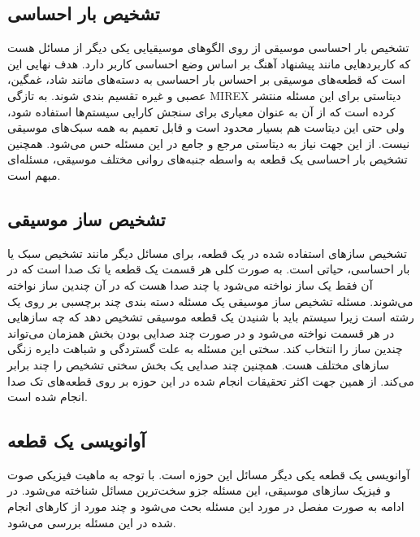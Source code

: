 \subsection{تشخیص بار احساسی}
تشخیص بار احساسی موسیقی از روی الگوهای موسیقیایی یکی دیگر از مسائل هست که
کاربردهایی مانند پیشنهاد آهنگ بر اساس وضع احساسی کاربر دارد. هدف نهایی این است
که قطعه‌های موسیقی بر احساس بار احساسی به دسته‌های مانند شاد، غمگین، عصبی و
غیره تقسیم بندی شوند. به تازگی
MIREX
دیتاستی برای این مسئله منتشر کرده است که از آن به عنوان معیاری برای سنجش کارایی
سیستم‌ها استفاده شود، ولی حتی این دیتاست هم بسیار محدود است و قابل تعمیم به همه
سبک‌های موسیقی نیست. از این جهت نیاز به دیتاستی مرجع و جامع در این مسئله حس
می‌شود. همچنین تشخیص بار احساسی یک قطعه به واسطه جنبه‌های روانی مختلف موسیقی،
مسئله‌ای مبهم است.

\subsection{تشخیص ساز موسیقی}
تشخیص سازهای استفاده شده در یک قطعه، برای مسائل دیگر مانند تشخیص سبک یا بار
احساسی، حیاتی است. به صورت کلی هر قسمت یک قطعه یا تک صدا است که در آن فقط یک
ساز نواخته می‌شود یا چند صدا هست که در آن چندین ساز نواخته می‌شوند. مسئله
تشخیص ساز موسیقی یک مسئله دسته بندی چند برچسبی بر روی یک رشته است زیرا سیستم
باید با شنیدن یک قطعه موسیقی تشخیص دهد که چه سازهایی در هر قسمت نواخته می‌شود
و در صورت چند صدایی بودن بخش همزمان می‌تواند چندین ساز را انتخاب کند. سختی این
مسئله به علت گستردگی و شباهت دایره زنگی سازهای مختلف هست. همچنین چند صدایی یک
بخش سختی تشخیص را چند برابر می‌کند. از همین جهت اکثر تحقیقات انجام شده در این
حوزه بر روی قطعه‌های تک صدا انجام شده است.

\subsection{آوانویسی یک قطعه}
آوانویسی یک قطعه یکی دیگر مسائل این حوزه است. با توجه به ماهیت فیزیکی صوت و
فیزیک سازهای موسیقی، این مسئله جزو سخت‌ترین مسائل شناخته می‌شود. در ادامه به
صورت مفصل در مورد این مسئله بحث می‌شود و چند مورد از کارهای انجام شده در این
مسئله بررسی می‌شود.



